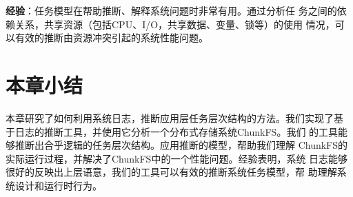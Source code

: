 \textbf{经验}：任务模型在帮助推断、解释系统问题时非常有用。通过分析任
务之间的依赖关系，共享资源（包括CPU、I/O，共享数据、变量、锁等）的使用
情况，可以有效的推断由资源冲突引起的系统性能问题。

\section{本章小结}
\label{lm_conclusion}

本章研究了如何利用系统日志，推断应用层任务层次结构的方法。我们实现了基
于日志的推断工具，并使用它分析一个分布式存储系统ChunkFS。我们
的工具能够推断出合乎逻辑的任务层次结构。应用推断的模型，帮助我们理解
ChunkFS的实际运行过程，并解决了ChunkFS中的一个性能问题。经验表明，系统
日志能够很好的反映出上层语意，我们的工具可以有效的推断系统任务模型，帮
助理解系统设计和运行时行为。
